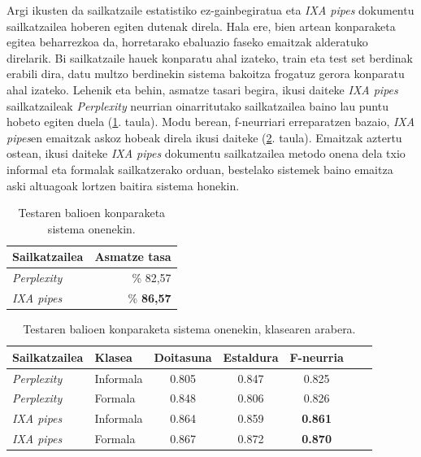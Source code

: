 \documentclass[information,article,submit,moreauthors,pdftex,10pt,a4paper]{Definitions/mdpi}
\begin{document}
\indent Argi ikusten da sailkatzaile estatistiko ez-gainbegiratua eta \textit{IXA pipes} dokumentu sailkatzailea hoberen egiten dutenak direla. Hala ere, bien artean konparaketa egitea beharrezkoa da, horretarako ebaluazio faseko emaitzak alderatuko direlarik. Bi sailkatzaile hauek konparatu ahal izateko, train eta test set berdinak erabili dira, datu multzo berdinekin sistema bakoitza frogatuz gerora konparatu ahal izateko. Lehenik eta behin, asmatze tasari begira, ikusi daiteke \textit{IXA pipes} sailkatzaileak \textit{Perplexity} neurrian oinarritutako sailkatzailea baino lau puntu hobeto egiten duela (\ref{tab:acc-dena}. taula). Modu berean, f-neurriari erreparatzen bazaio, \textit{IXA pipes}en emaitzak askoz hobeak direla ikusi daiteke (\ref{tab:final test}. taula). Emaitzak aztertu ostean, ikusi daiteke \textit{IXA pipes} dokumentu sailkatzailea metodo onena dela txio informal eta formalak sailkatzerako orduan, bestelako sistemek baino emaitza aski altuagoak lortzen baitira sistema honekin.

\begin{table}[H]
  \centering
  \begin{tabular}{|l|r|}
    \hline
    \textbf{Sailkatzailea} & \textbf{Asmatze tasa} \\ \hline 
    \textit{Perplexity} &  \% 82,57\\ \hline
    \textit{IXA pipes} &  \% \textbf{86,57}\\ \hline
  \end{tabular}
  \caption{Testaren balioen konparaketa sistema onenekin.}
  \label{tab:acc-dena}
\end{table}

\begin{table}[H]
  \centering
  \begin{tabular}{|l|l|c|c|c|c|c|}
    \hline
    \textbf{Sailkatzailea} & \textbf{Klasea} & \textbf{Doitasuna} & \textbf{Estaldura} & \textbf{F-neurria}\\ \hline 
    \textit{Perplexity} & Informala & 0.805  & 0.847  & 0.825\\ \hline 
    \textit{Perplexity} & Formala & 0.848 & 0.806 & 0.826\\ \hline
    \textit{IXA pipes} & Informala & 0.864  & 0.859  & \textbf{0.861}\\ \hline 
    \textit{IXA pipes} & Formala & 0.867 & 0.872 & \textbf{0.870}\\ \hline
  \end{tabular}
  \caption{Testaren balioen konparaketa sistema onenekin, klasearen arabera.}
  \label{tab:final test}
\end{table}
\end{document}
